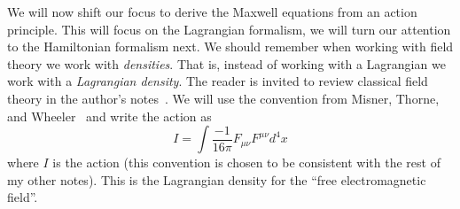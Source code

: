  We will now shift our focus to derive the Maxwell
equations from an action principle. This will focus on the
Lagrangian formalism, we will turn our attention to the
Hamiltonian formalism next. We should remember when working with
field theory we work with \emph{densities}. That is, instead of
working with a Lagrangian we work with a \emph{Lagrangian density}.
The reader is invited to review classical field theory in the
author's notes~\cite{hamiltonianFieldTheory}. We will use the
convention from Misner, Thorne, and
Wheeler~\cite{MisnerThorneWheeler} and write the action as
\begin{equation}%
I = \int \frac{-1}{16\pi}F_{\mu\nu}F^{\mu\nu}d^{4}x
\end{equation}
where $I$ is the action (this convention is chosen to be
consistent with the rest of my other notes). This is the
Lagrangian density for the ``free electromagnetic field''.

